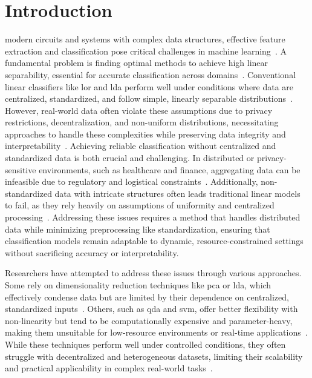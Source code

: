 \documentclass[lettersize,journal]{IEEEtran}
\begin{document}
\section{Introduction}
 modern circuits and systems with complex data structures, effective feature extraction and classification pose critical challenges in machine learning~\cite{labrinidis2012challenges}. A fundamental problem is finding optimal methods to achieve high linear separability, essential for accurate classification across domains~\cite{hastie2009elements}. Conventional linear classifiers like \Gls{lor} and \Gls{lda} perform well under conditions where data are centralized, standardized, and follow simple, linearly separable distributions~\cite{hastie2009elements}. However, real-world data often violate these assumptions due to privacy restrictions, decentralization, and non-uniform distributions, necessitating approaches to handle these complexities while preserving data integrity and interpretability~\cite{yang2020federated,kaissis2020secure,li2021survey}.
Achieving reliable classification without centralized and standardized data is both crucial and challenging. In distributed or privacy-sensitive environments, such as healthcare and finance, aggregating data can be infeasible due to regulatory and logistical constraints~\cite{kaissis2020secure,li2021survey}. Additionally, non-standardized data with intricate structures often leads traditional linear models to fail, as they rely heavily on assumptions of uniformity and centralized processing~\cite{singh2020investigating}. Addressing these issues requires a method that handles distributed data while minimizing preprocessing like standardization, ensuring that classification models remain adaptable to dynamic, resource-constrained settings without sacrificing accuracy or interpretability.

Researchers have attempted to address these issues through various approaches. Some rely on dimensionality reduction techniques like \Gls{pca} or \Gls{lda}, which effectively condense data but are limited by their dependence on centralized, standardized inputs~\cite{hastie2009elements}. Others, such as \Gls{qda} and \Gls{svm}, offer better flexibility with non-linearity but tend to be computationally expensive and parameter-heavy, making them unsuitable for low-resource environments or real-time applications~\cite{pavlov2000scaling}. While these techniques perform well under controlled conditions, they often struggle with decentralized and heterogeneous datasets, limiting their scalability and practical applicability in complex real-world tasks~\cite{li2021survey}.
\end{document}
